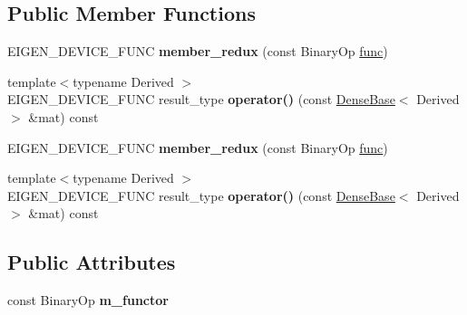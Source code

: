 \subsection*{Public Member Functions}
\begin{DoxyCompactItemize}
\item 
\mbox{\label{struct_eigen_1_1internal_1_1member__redux_a3834c69fd720e415d64a76d1ad8394ed}} 
E\+I\+G\+E\+N\+\_\+\+D\+E\+V\+I\+C\+E\+\_\+\+F\+U\+NC {\bfseries member\+\_\+redux} (const Binary\+Op \hyperlink{structfunc}{func})
\item 
\mbox{\label{struct_eigen_1_1internal_1_1member__redux_aabfb2396430ad31ceb9f0ce2c9085ae8}} 
{\footnotesize template$<$typename Derived $>$ }\\E\+I\+G\+E\+N\+\_\+\+D\+E\+V\+I\+C\+E\+\_\+\+F\+U\+NC result\+\_\+type {\bfseries operator()} (const \hyperlink{group___core___module_class_eigen_1_1_dense_base}{Dense\+Base}$<$ Derived $>$ \&mat) const
\item 
\mbox{\label{struct_eigen_1_1internal_1_1member__redux_a3834c69fd720e415d64a76d1ad8394ed}} 
E\+I\+G\+E\+N\+\_\+\+D\+E\+V\+I\+C\+E\+\_\+\+F\+U\+NC {\bfseries member\+\_\+redux} (const Binary\+Op \hyperlink{structfunc}{func})
\item 
\mbox{\label{struct_eigen_1_1internal_1_1member__redux_aabfb2396430ad31ceb9f0ce2c9085ae8}} 
{\footnotesize template$<$typename Derived $>$ }\\E\+I\+G\+E\+N\+\_\+\+D\+E\+V\+I\+C\+E\+\_\+\+F\+U\+NC result\+\_\+type {\bfseries operator()} (const \hyperlink{group___core___module_class_eigen_1_1_dense_base}{Dense\+Base}$<$ Derived $>$ \&mat) const
\end{DoxyCompactItemize}
\subsection*{Public Attributes}
\begin{DoxyCompactItemize}
\item 
\mbox{\label{struct_eigen_1_1internal_1_1member__redux_ae7fc03a21a3cafa6cd4698f894fb390f}} 
const Binary\+Op {\bfseries m\+\_\+functor}
\end{DoxyCompactItemize}


